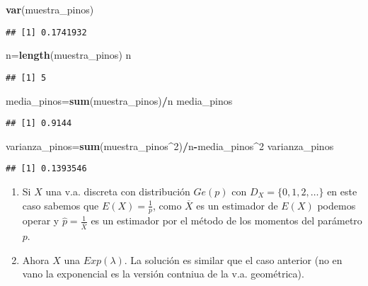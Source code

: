 \documentclass[]{article}
\newenvironment{Shaded}{\begin{snugshade}}{\end{snugshade}}
\newcommand{\DecValTok}[1]{\textcolor[rgb]{0.00,0.00,0.81}{#1}}
\newcommand{\KeywordTok}[1]{\textcolor[rgb]{0.13,0.29,0.53}{\textbf{#1}}}
\newcommand{\NormalTok}[1]{#1}
\newcommand{\OperatorTok}[1]{\textcolor[rgb]{0.81,0.36,0.00}{\textbf{#1}}}
\begin{document}
\begin{Shaded}
\begin{Highlighting}[]
\KeywordTok{var}\NormalTok{(muestra_pinos)}
\end{Highlighting}
\end{Shaded}

\begin{verbatim}
## [1] 0.1741932
\end{verbatim}

\begin{Shaded}
\begin{Highlighting}[]
\NormalTok{n=}\KeywordTok{length}\NormalTok{(muestra_pinos)}
\NormalTok{n}
\end{Highlighting}
\end{Shaded}

\begin{verbatim}
## [1] 5
\end{verbatim}

\begin{Shaded}
\begin{Highlighting}[]
\NormalTok{media_pinos=}\KeywordTok{sum}\NormalTok{(muestra_pinos)}\OperatorTok{/}\NormalTok{n}
\NormalTok{media_pinos}
\end{Highlighting}
\end{Shaded}

\begin{verbatim}
## [1] 0.9144
\end{verbatim}

\begin{Shaded}
\begin{Highlighting}[]
\NormalTok{varianza_pinos=}\KeywordTok{sum}\NormalTok{(muestra_pinos}\OperatorTok{^}\DecValTok{2}\NormalTok{)}\OperatorTok{/}\NormalTok{n}\OperatorTok{-}\NormalTok{media_pinos}\OperatorTok{^}\DecValTok{2}
\NormalTok{varianza_pinos}
\end{Highlighting}
\end{Shaded}

\begin{verbatim}
## [1] 0.1393546
\end{verbatim}

\begin{enumerate}
\def\labelenumi{\arabic{enumi}.}
\setcounter{enumi}{2}
\item
  Si \(X\) una v.a. discreta con distribución \(Ge(p)\) con
  \(D_X=\{0,1,2,\ldots\}\) en este caso sabemos que
  \(E(X)=\frac{1}{p}\), como \(\overline{X}\) es un estimador de
  \(E(X)\) podemos operar y \(\hat{p}=\frac{1}{\overline{X}}\) es un
  estimador por el método de los momentos del parámetro \(p\).
\item
  Ahora \(X\) una \(Exp(\lambda)\). La solución es similar que el caso
  anterior (no en vano la exponencial es la versión contniua de la v.a.
  geométrica).
\end{enumerate}
\end{document}
